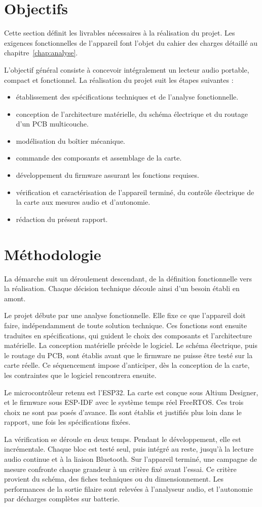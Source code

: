 \clearpage
\section{Objectifs}
Cette section définit les livrables nécessaires à la réalisation du projet. Les exigences fonctionnelles de l'appareil font l'objet du cahier des charges détaillé au chapitre~\ref{chap:analyse}.

L'objectif général consiste à concevoir intégralement un lecteur audio portable, compact et fonctionnel. La réalisation du projet suit les étapes suivantes :
\begin{itemize}
      \item établissement des spécifications techniques et de l'analyse fonctionnelle.
      \item conception de l'architecture matérielle, du schéma électrique et du routage d'un PCB multicouche.
      \item modélisation du boîtier mécanique.
      \item commande des composants et assemblage de la carte.
      \item développement du firmware assurant les fonctions requises.
      \item vérification et caractérisation de l'appareil terminé, du contrôle électrique de la carte aux mesures audio et d'autonomie.
      \item rédaction du présent rapport.
\end{itemize}


\section{Méthodologie}
La démarche suit un déroulement descendant, de la définition fonctionnelle vers la réalisation. Chaque décision technique découle ainsi d'un besoin établi en amont.

Le projet débute par une analyse fonctionnelle. Elle fixe ce que l'appareil doit faire, indépendamment de toute solution technique. Ces fonctions sont ensuite traduites en spécifications, qui guident le choix des composants et l'architecture matérielle. La conception matérielle précède le logiciel. Le schéma électrique, puis le routage du PCB, sont établis avant que le firmware ne puisse être testé sur la carte réelle. Ce séquencement impose d'anticiper, dès la conception de la carte, les contraintes que le logiciel rencontrera ensuite.

Le microcontrôleur retenu est l'ESP32. La carte est conçue sous Altium Designer, et le firmware sous ESP-IDF avec le système temps réel FreeRTOS. Ces trois choix ne sont pas posés d'avance. Ils sont établis et justifiés plus loin dans le rapport, une fois les spécifications fixées.

La vérification se déroule en deux temps. Pendant le développement, elle est incrémentale. Chaque bloc est testé seul, puis intégré au reste, jusqu'à la lecture audio continue et à la liaison Bluetooth. Sur l'appareil terminé, une campagne de mesure confronte chaque grandeur à un critère fixé avant l'essai. Ce critère provient du schéma, des fiches techniques ou du dimensionnement. Les performances de la sortie filaire sont relevées à l'analyseur audio, et l'autonomie par décharges complètes sur batterie.